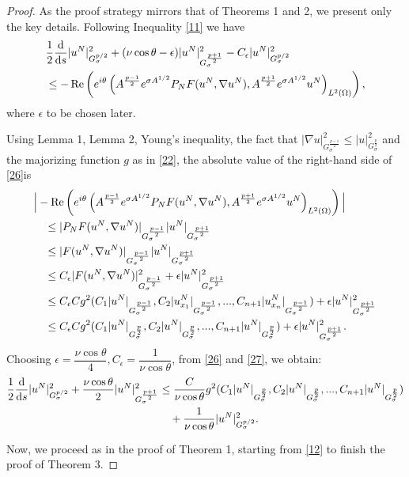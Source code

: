 \documentclass[10pt,a4paper]{amsart}
\newcommand{\Gspace}{G_\sigma^{p/2}}
\newcommand{\dd}{\mathrm{d}}
\begin{document}
\begin{proof}
As the proof strategy mirrors that of Theorems 1 and 2, we present only the key details.
Following Inequality \eqref{11} we have
\begin{align}
& \frac{1}{2} \frac{\dd}{\dd s} |u^N|_{G_\sigma^{p/2}}^2 + (\nu \cos\theta -\epsilon)|u^N|_{G_\sigma^{\frac{p+1}{2}}}^2 -C_{\epsilon}|u^N|_{
G_\sigma^{p/2}
}^2 \notag \\
&\leq -\operatorname{Re}\left( e^{i\theta}
\left( A^\frac{p-1}{2} e^{\sigma A^{1/2}} P_N F(u^N,\nabla u^N), A^\frac{p+1}{2} e^{\sigma A^{1/2}} u^N \right)_ {L^2(\Omega)}\right),\label{26}
\end{align}
where $\epsilon$ to be chosen later.

Using Lemma 1, Lemma 2, Young's inequality, the fact that  $|\nabla u|^2_{G_{\sigma}^{\frac{p-1}{2}}}\leq | u|^2_{G_{\sigma}^{\frac{p}{2}}}$  and the majorizing function $g$ as in \eqref{22}, the absolute value of the  right-hand side of \eqref{26}is
\begin{align}
&\Big|-\operatorname{Re}\left( e^{i\theta}
\left( A^{\frac{p-1}{2}} e^{\sigma A^{1/2}} P_N F(u^N,\nabla u^N), A^{\frac{p+1}{2}} e^{\sigma A^{1/2}} u^N \right)_ {L^2(\Omega)}\right)\Big| \notag \\
&\quad\leq  |P_NF(u^N,\nabla u^N)|_{G^{\frac{p-1}{2}}_{\sigma}}|u^N|_{G^{\frac{p+1}{2}}_{\sigma}}\notag \\
&\quad \leq  |F(u^N,\nabla u^N)|_{G^{\frac{p-1}{2}}_{\sigma}}|u^N|_{G^{\frac{p+1}{2}}_{\sigma}}\notag \\
&\quad \leq C_{\epsilon}|F(u^N,\nabla u^N)|^2_{G^{\frac{p-1}{2}}_{\sigma}}+\epsilon|u^N|^2_{G^{\frac{p+1}{2}}_{\sigma}}\notag \\
&\quad \leq C_{\epsilon}C g^2(C_1 |u^N|_{G_\sigma^{\frac{p-1}{2}}},C_2 |u^N_{x_1}|_{G_\sigma^{\frac{p-1}{2}}},...,C_{n+1} |u^N_{x_n}|_{G_\sigma^{\frac{p-1}{2}}})+\epsilon|u^N|^2_{G^{\frac{p+1}{2}}_{\sigma}}\notag \\
&\quad \leq C_{\epsilon}C g^2(C_1 |u^N|_{G_\sigma^{\frac{p}{2}}},C_2 |u^N|_{G_\sigma^{\frac{p}{2}}},...,C_{n+1} |u^N|_{G_\sigma^{\frac{p}{2}}})+\epsilon|u^N|^2_{G^{\frac{p+1}{2}}_{\sigma}}.\label{27}
\end{align}
Choosing $\epsilon=\dfrac{\nu \cos\theta}{4},C_{\epsilon}=\dfrac{1}{\nu \cos\theta}$, from \eqref{26} and \eqref{27}, we obtain:
\begin{align*}
\frac{1}{2} \frac{\dd}{\dd s} |u^N|^2_{\Gspace} + \frac{\nu\cos\theta}{2}|u^N|_{G_\sigma^{\frac{p+1}{2}}}^2 &\leq \frac{C}{\nu \cos\theta} g^2(C_1 |u^N|_{G_\sigma^{\frac{p}{2}}},C_2 |u^N|_{G_\sigma^{\frac{p}{2}}},...,C_{n+1} |u^N|_{G_\sigma^{\frac{p}{2}}})\notag\\&\quad+\frac{1}{\nu \cos\theta}|u^N|_{
G_\sigma^{p/2}
}^2.
\end{align*}

Now, we proceed as in the proof of Theorem 1, starting from \eqref{12} to finish the proof of Theorem 3.
\end{proof}
\end{document}
